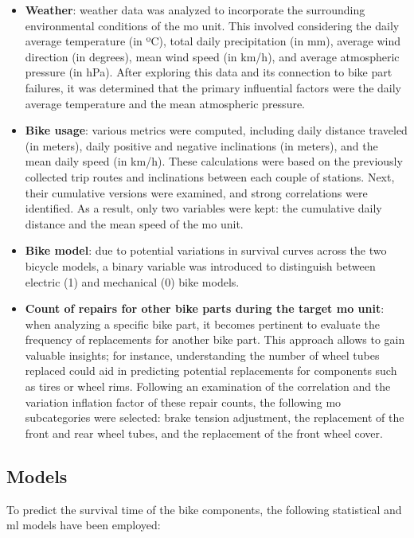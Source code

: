 \begin{itemize}
\item \textbf{Weather}: weather data was analyzed to incorporate the surrounding environmental conditions of the \ac{mo} unit. This involved considering the daily average temperature (in ºC), total daily precipitation (in mm), average wind direction (in degrees), mean wind speed (in km/h), and average atmospheric pressure (in hPa). After exploring this data and its connection to bike part failures, it was determined that the primary influential factors were the daily average temperature and the mean atmospheric pressure.
\item \textbf{Bike usage}: various metrics were computed, including daily distance traveled (in meters), daily positive and negative inclinations (in meters), and the mean daily speed (in km/h). These calculations were based on the previously collected trip routes and inclinations between each couple of stations. Next, their cumulative versions were examined, and strong correlations were identified. As a result, only two variables were kept: the cumulative daily distance and the mean speed of the \ac{mo} unit.
\item \textbf{Bike model}: due to potential variations in survival curves across the two bicycle models, a binary variable was introduced to distinguish between electric (1) and mechanical (0) bike models.
\item \textbf{Count of repairs for other bike parts during the target \ac{mo} unit}: when analyzing a specific bike part, it becomes pertinent to evaluate the frequency of replacements for another bike part. This approach allows to gain valuable insights; for instance, understanding the number of wheel tubes replaced could aid in predicting potential replacements for components such as tires or wheel rims. Following an examination of the correlation and the variation inflation factor of these repair counts, the following \ac{mo} subcategories were selected: brake tension adjustment, the replacement of the front and rear wheel tubes, and the replacement of the front wheel cover.
\end{itemize}

    \subsection{Models}
To predict the survival time of the bike components, the following statistical and \ac{ml} models have been employed:

